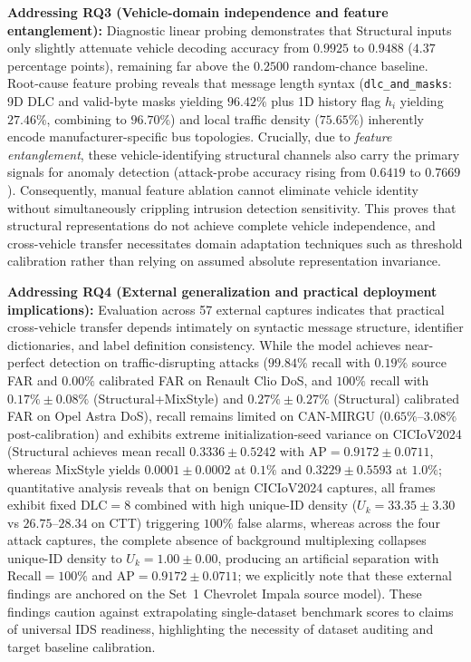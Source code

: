 \documentclass[12pt, a4paper, reqno, oneside]{book}
\DeclareRobustCommand{\code}[1]{\nolinkurl{#1}}
\begin{document}
\textbf{Addressing RQ3 (Vehicle-domain independence and feature entanglement):}
Diagnostic linear probing demonstrates that Structural inputs only slightly attenuate vehicle decoding accuracy from $0.9925$ to $0.9488$ ($4.37$ percentage points), remaining far above the $0.2500$ random-chance baseline. Root-cause feature probing reveals that message length syntax (\code{dlc\_and\_masks}: 9D DLC and valid-byte masks yielding $96.42\%$ plus 1D history flag $h_i$ yielding $27.46\%$, combining to $96.70\%$) and local traffic density ($75.65\%$) inherently encode manufacturer-specific bus topologies. Crucially, due to \textit{feature entanglement}, these vehicle-identifying structural channels also carry the primary signals for anomaly detection (attack-probe accuracy rising from $0.6419$ to $0.7669$). Consequently, manual feature ablation cannot eliminate vehicle identity without simultaneously crippling intrusion detection sensitivity. This proves that structural representations do not achieve complete vehicle independence, and cross-vehicle transfer necessitates domain adaptation techniques such as threshold calibration rather than relying on assumed absolute representation invariance.

\textbf{Addressing RQ4 (External generalization and practical deployment implications):}
Evaluation across 57 external captures indicates that practical cross-vehicle transfer depends intimately on syntactic message structure, identifier dictionaries, and label definition consistency. While the model achieves near-perfect detection on traffic-disrupting attacks ($99.84\%$ recall with $0.19\%$ source FAR and $0.00\%$ calibrated FAR on Renault Clio DoS, and $100\%$ recall with $0.17\% \pm 0.08\%$ (Structural+MixStyle) and $0.27\% \pm 0.27\%$ (Structural) calibrated FAR on Opel Astra DoS), recall remains limited on CAN-MIRGU ($0.65\%\text{--}3.08\%$ post-calibration) and exhibits extreme initialization-seed variance on CICIoV2024 (Structural achieves mean recall $0.3336 \pm 0.5242$ with $\text{AP}=0.9172 \pm 0.0711$, whereas MixStyle yields $0.0001 \pm 0.0002$ at $0.1\%$ and $0.3229 \pm 0.5593$ at $1.0\%$; quantitative analysis reveals that on benign CICIoV2024 captures, all frames exhibit fixed $\text{DLC}=8$ combined with high unique-ID density ($U_k = 33.35 \pm 3.30$ vs $26.75\text{--}28.34$ on CTT) triggering $100\%$ false alarms, whereas across the four attack captures, the complete absence of background multiplexing collapses unique-ID density to $U_k = 1.00 \pm 0.00$, producing an artificial separation with $\text{Recall}=100\%$ and $\text{AP}=0.9172 \pm 0.0711$; we explicitly note that these external findings are anchored on the Set~1 Chevrolet Impala source model). These findings caution against extrapolating single-dataset benchmark scores to claims of universal IDS readiness, highlighting the necessity of dataset auditing and target baseline calibration.
\end{document}

